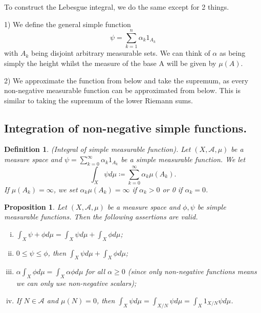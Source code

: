 \documentclass[twoside]{article}
\newtheorem{proposition}[theorem]{Proposition}
\newtheorem{definition}[theorem]{Definition}
\begin{document}
To construct the Lebesgue integral, we do the same except for 2 things. 

1) We define the general simple function
$$
\psi = \sum_{k=1}^n\alpha_k1_{A_k}
$$
with $A_k$ being disjoint arbitrary measurable sets. We can think of $\alpha$ as being simply the height whilst the measure of the base A will be given by $\mu(A)$.

2) We approximate the function from below and take the supremum, as every non-negative measurable function can be approximated from below. This is similar to taking the supremum of the lower Riemann sums.

\subsection{Integration of non-negative simple functions.}
\begin{definition}
(Integral of simple measurable function). Let $(X, \mathcal{A}, \mu)$ be a measure space and $\psi = \sum_{k=0}^{\infty} \alpha_k1_{A_k}$ be a simple measurable function. We let
$$
\int_X\psi d\mu \coloneqq \sum_{k=0}^{\infty}\alpha_k\mu(A_k).
$$
If $\mu(A_k) = \infty$, we set $\alpha_k\mu(A_k) = \infty$ if $\alpha_k > 0$ or 0 if $\alpha_k=0$.
\end{definition}

\begin{proposition}
Let $(X,\mathcal{A},\mu)$ be a measure space and $\phi, \psi$ be simple measurable functions. Then the following assertions are valid.

\begin{enumerate}[(i)]
    \item $\int_X \psi + \phi d\mu = \int_X \psi d\mu + \int_X \phi d\mu$;
    \item $0 \leq \psi \leq \phi$, then $\int_X \psi d\mu + \int_X \phi d\mu$;
    \item $\alpha \int_X \phi d\mu = \int_X \alpha \phi d\mu$ for all $\alpha \geq 0$ (since only non-negative functions means we can only use non-negative scalars);
    \item If $N \in \mathcal{A}$ and $\mu(N) = 0$, then $\int_X \psi d\mu = \int_{X/N}\psi d\mu = \int_X 1_{X/N}\psi d\mu$. 
\end{enumerate}
\end{proposition}
\end{document}
